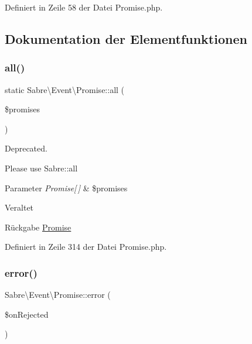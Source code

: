 Definiert in Zeile 58 der Datei Promise.\+php.



\subsection{Dokumentation der Elementfunktionen}
\mbox{\label{class_sabre_1_1_event_1_1_promise_a67f3e30bf34b8c9489f90d3633ea50e3}} 
\subsubsection{\texorpdfstring{all()}{all()}}
{\footnotesize\ttfamily static Sabre\textbackslash{}\+Event\textbackslash{}\+Promise\+::all (\begin{DoxyParamCaption}\item[{array}]{\$promises }\end{DoxyParamCaption})\hspace{0.3cm}{\ttfamily [static]}}

Deprecated.

Please use Sabre\+::all


\begin{DoxyParams}{Parameter}
{\em Promise\mbox{[}$\,$\mbox{]}} & \$promises \\
\hline
\end{DoxyParams}
\begin{DoxyRefDesc}{Veraltet}
\item[\mbox{\hyperlink{deprecated__deprecated000048}{Veraltet}}]\end{DoxyRefDesc}
\begin{DoxyReturn}{Rückgabe}
\mbox{\hyperlink{class_sabre_1_1_event_1_1_promise}{Promise}} 
\end{DoxyReturn}


Definiert in Zeile 314 der Datei Promise.\+php.

\mbox{\label{class_sabre_1_1_event_1_1_promise_aced9a7533529562d138b9c02ab6d7140}} 
\subsubsection{\texorpdfstring{error()}{error()}}
{\footnotesize\ttfamily Sabre\textbackslash{}\+Event\textbackslash{}\+Promise\+::error (\begin{DoxyParamCaption}\item[{callable}]{\$on\+Rejected }\end{DoxyParamCaption})}

